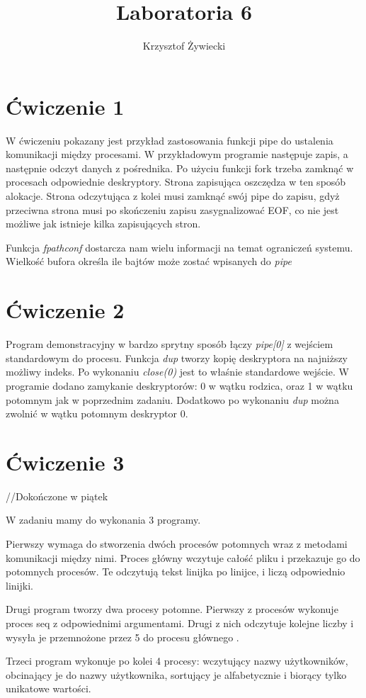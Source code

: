 \documentclass[a4paper, 12pt]{article}
\title{Laboratoria 6}
\author{Krzysztof Żywiecki}
\begin{document}
\maketitle

\section*{Ćwiczenie 1}

W ćwiczeniu pokazany jest przykład zastosowania funkcji pipe do ustalenia komunikacji między procesami. W przykładowym programie następuje zapis, a następnie odczyt danych z pośrednika. Po użyciu funkcji fork trzeba zamknąć w procesach odpowiednie deskryptory. Strona zapisująca oszczędza w ten sposób alokacje. Strona odczytująca z kolei musi zamknąć swój pipe do zapisu, gdyż przeciwna strona musi po skończeniu zapisu zasygnalizować EOF, co nie jest możliwe jak istnieje kilka zapisujących stron.

Funkcja \emph{fpathconf} dostarcza nam wielu informacji na temat ograniczeń systemu. Wielkość bufora określa ile bajtów może zostać wpisanych do \emph{pipe}

\section*{Ćwiczenie 2}
Program demonstracyjny w bardzo sprytny sposób łączy \emph{pipe[0]} z wejściem standardowym do procesu. Funkcja \emph{dup} tworzy kopię deskryptora na najniższy możliwy indeks. Po wykonaniu \emph{close(0)} jest to właśnie standardowe wejście. W programie dodano zamykanie deskryptorów: 0 w wątku rodzica, oraz 1 w wątku potomnym jak w poprzednim zadaniu. Dodatkowo po wykonaniu \emph{dup} można zwolnić w wątku potomnym deskryptor 0.

\section*{Ćwiczenie 3}
//Dokończone w piątek

W zadaniu mamy do wykonania 3 programy.

Pierwszy wymaga do stworzenia dwóch procesów potomnych wraz z metodami komunikacji między nimi. Proces główny wczytuje całość pliku i przekazuje go do potomnych procesów. Te odczytują tekst linijka po linijce, i liczą odpowiednio linijki.

Drugi program tworzy dwa procesy potomne. Pierwszy z procesów wykonuje proces seq z odpowiednimi argumentami. Drugi z nich odczytuje kolejne liczby i wysyła je przemnożone przez 5 do procesu głównego .

Trzeci program wykonuje po kolei 4 procesy: wczytujący nazwy użytkowników, obcinający je do nazwy użytkownika, sortujący je alfabetycznie i biorący tylko unikatowe wartości.
\end{document}
